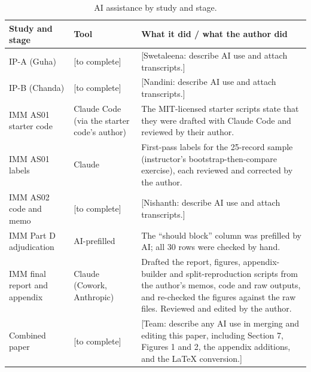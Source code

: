 \documentclass[10pt,letterpaper]{article}
\begin{document}
\begin{table}[H]
\centering\footnotesize
\caption{AI assistance by study and stage.}
\begin{tabularx}{\textwidth}{@{}p{3.3cm}p{3.4cm}L@{}}
\toprule
\textbf{Study and stage} & \textbf{Tool} & \textbf{What it did / what the author did}\\
\midrule
IP-A (Guha) & [to complete] & [Swetaleena: describe AI use and attach transcripts.]\\
IP-B (Chanda) & [to complete] & [Nandini: describe AI use and attach transcripts.]\\
IMM AS01 starter code & Claude Code (via the starter code's author) & The MIT-licensed starter scripts state that they were drafted with Claude Code and reviewed by their author.\\
IMM AS01 labels & Claude & First-pass labels for the 25-record sample (instructor's bootstrap-then-compare exercise), each reviewed and corrected by the author.\\
IMM AS02 code and memo & [to complete] & [Nishanth: describe AI use and attach transcripts.]\\
IMM Part D adjudication & AI-prefilled & The ``should block'' column was prefilled by AI; all 30 rows were checked by hand.\\
IMM final report and appendix & Claude (Cowork, Anthropic) & Drafted the report, figures, appendix-builder and split-reproduction scripts from the author's memos, code and raw outputs, and re-checked the figures against the raw files. Reviewed and edited by the author.\\
Combined paper & [to complete] & [Team: describe any AI use in merging and editing this paper, including Section 7, Figures 1 and 2, the appendix additions, and the LaTeX conversion.]\\
\bottomrule
\end{tabularx}
\end{table}
\end{document}
